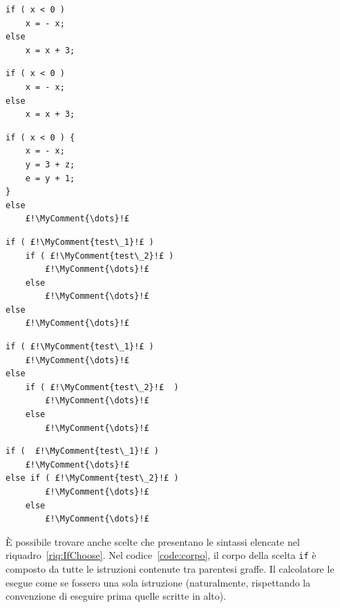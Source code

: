 

\begin{code}
\begin{minipage}{0.45\columnwidth}
	\begin{lstlisting}[caption={\ },nolol]
if ( x < 0 )
	x = - x;
else
	x = x + 3;
	\end{lstlisting}
\end{minipage}	\hfill
\begin{minipage}{0.45\columnwidth}
	\begin{lstlisting}[caption={\ },nolol]
if ( x < 0 )
	x = - x;
else
	x = x + 3;
	\end{lstlisting}
\end{minipage}	\hfill
\begin{minipage}{0.45\columnwidth}
	\begin{lstlisting}[caption={\ },nolol,label={code:corpo}]
if ( x < 0 ) {
	x = - x;
	y = 3 + z;
	e = y + 1;
}
else
	£!\MyComment{\dots}!£
	\end{lstlisting}
\end{minipage}	\hfill
\begin{minipage}{0.45\columnwidth}
\begin{lstlisting}[caption={\ },nolol]
if ( £!\MyComment{test\_1}!£ )
	if ( £!\MyComment{test\_2}!£ )
		£!\MyComment{\dots}!£
	else
		£!\MyComment{\dots}!£
else
	£!\MyComment{\dots}!£
	\end{lstlisting}
\end{minipage}	\hfill
\begin{minipage}{0.45\columnwidth}
	\begin{lstlisting}[caption={\ },nolol]
if ( £!\MyComment{test\_1}!£ ) 
	£!\MyComment{\dots}!£
else
	if ( £!\MyComment{test\_2}!£  )
		£!\MyComment{\dots}!£
	else
		£!\MyComment{\dots}!£
	\end{lstlisting}
\end{minipage}	\hfill
\begin{minipage}{0.45\columnwidth}
	\begin{lstlisting}[caption={\ },nolol]
if (  £!\MyComment{test\_1}!£ ) 
	£!\MyComment{\dots}!£
else if ( £!\MyComment{test\_2}!£ )
		£!\MyComment{\dots}!£
	else
		£!\MyComment{\dots}!£
	\end{lstlisting}
\end{minipage}
\caption{Sintassi della scelta \lstinline!if!.}
\label{riq:IfChoose}
\end{code}
È possibile trovare anche scelte che presentano le sintassi elencate nel riquadro~\ref{riq:IfChoose}.
Nel codice~\ref{code:corpo}, il corpo della scelta \lstinline!if! è composto da tutte le istruzioni contenute tra parentesi graffe.
Il calcolatore le esegue come se fossero una sola istruzione (naturalmente, rispettando la convenzione di eseguire prima quelle scritte  in alto).

